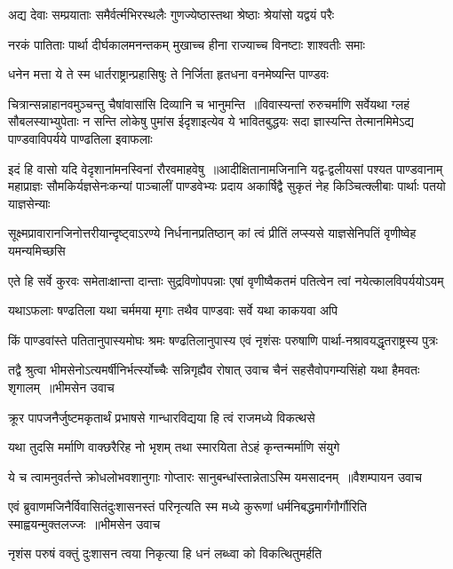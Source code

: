 \twolineshloka
{अद्य देवाः सम्प्रयाताः समैर्वर्त्मभिरस्थलैः}
{गुणज्येष्ठास्तथा श्रेष्ठाः श्रेयांसो यद्वयं परैः}


\twolineshloka
{नरकं पातिताः पार्था दीर्घकालमनन्तकम्}
{मुखाच्च हीना राज्याच्च विनष्टाः शाश्वतीः समाः}


\twolineshloka
{धनेन मत्ता ये ते स्म धार्तराष्ट्रान्प्रहासिषुः}
{ते निर्जिता हृतधना वनमेष्यन्ति पाण्डवः}


चित्रान्सन्नाहानवमुञ्चन्तु चैषांवासांसि दिव्यानि च भानुमन्ति ॥विवास्यन्तां रुरुचर्माणि सर्वेयथा ग्लहं सौबलस्याभ्युपेताः
\twolineshloka
{न सन्ति लोकेषु पुमांस ईदृशाइत्येव ये भावितबुद्धयः सदा}
{ज्ञास्यन्ति तेत्मानमिमेऽद्य पाण्डवाविपर्यये पाण्ढतिला इवाफलाः}


इदं हि वासो यदि वेदृशानांमनस्विनां रौरवमाहवेषु ॥आदीक्षितानामजिनानि यद्व-द्वलीयसां पश्यत पाण्डवानाम्
\twolineshloka
{महाप्राज्ञः सौमकिर्यज्ञसेनःकन्यां पाञ्चालीं पाण्डवेभ्यः प्रदाय}
{अकार्षिद्वै सुकृतं नेह किञ्चित्क्लीबाः पार्थाः पतयो याज्ञसेन्याः}


\twolineshloka
{सूक्ष्मप्रावारानजिनोत्तरीयान्दृष्ट्वाऽरण्ये निर्धनानप्रतिष्ठान्}
{कां त्वं प्रीतिं लप्स्यसे याज्ञसेनिपतिं वृणीष्वेह यमन्यमिच्छसि}


\twolineshloka
{एते हि सर्वे कुरवः समेताःक्षान्ता दान्ताः सुद्रविणोपपन्नाः}
{एषां वृणीष्वैकतमं पतित्वेन त्वां नयेत्कालविपर्ययोऽयम्}


\twolineshloka
{यथाऽफलाः षण्ढतिला यथा चर्ममया मृगाः}
{तथैव पाण्डवाः सर्वे यथा काकयवा अपि}


\twolineshloka
{किं पाण्डवांस्ते पतितानुपास्यमोघः श्रमः षण्ढतिलानुपास्य}
{एवं नृशंसः परुषाणि पार्था-नश्रावयद्धृतराष्ट्रस्य पुत्रः}


\twolineshloka
{तद्वै श्रुत्वा भीमसेनोऽत्यमर्षीनिर्भर्त्स्योच्चैः सन्निगृह्यैव रोषात्}
{उवाच चैनं सहसैवोपगम्यसिंहो यथा हैमवतः शृगालम् ॥भीमसेन उवाच}


\twolineshloka
{क्रूर पापजनैर्जुष्टमकृतार्थं प्रभाषसे}
{गान्धारविद्यया हि त्वं राजमध्ये विकत्थसे}


\twolineshloka
{यथा तुदसि मर्माणि वाक्छरैरिह नो भृशम्}
{तथा स्मारयिता तेऽहं कृन्तन्मर्माणि संयुगे}


\twolineshloka
{ये च त्वामनुवर्तन्ते क्रोधलोभवशानुगाः}
{गोप्तारः सानुबन्धांस्तान्नेताऽस्मि यमसादनम् ॥वैशम्पायन उवाच}


\twolineshloka
{एवं ब्रुवाणमजिनैर्विवासितंदुःशासनस्तं परिनृत्यति स्म}
{मध्ये कुरूणां धर्मनिबद्धमार्गंगौर्गौरिति स्माह्वयन्मुक्तलज्जः ॥भीमसेन उवाच}


\twolineshloka
{नृशंस परुषं वक्तुं दुःशासन त्वया}
{निकृत्या हि धनं लब्ध्वा को विकत्थितुमर्हति}


